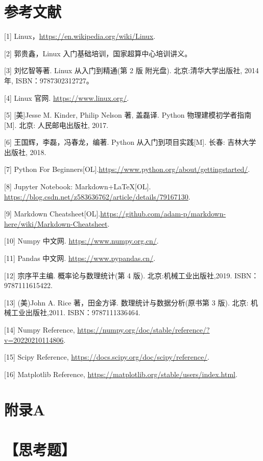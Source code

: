 \documentclass[10pt,a4paper,twoside,UTF8]{ctexart}
\begin{document}
\section*{参考文献}
% 
% 
[1] Linux，\url{https://en.wikipedia.org/wiki/Linux}.

[2] 郭贵鑫，Linux 入门基础培训，国家超算中心培训讲义。

[3] 刘忆智等著. Linux 从入门到精通(第 2 版 附光盘). 北京:清华大学出版社, 2014 年, ISBN：9787302312727。

[4] Linux 官网. \url{https://www.linux.org/}.

[5] [美]Jesse M. Kinder, Philip Nelson 著, 盖磊译. Python 物理建模初学者指南[M]. 北京: 
人民邮电出版社, 2017.

[6] 王国辉，李磊，冯春龙，编著. Python 从入门到项目实践[M]. 长春: 吉林大学出版社, 2018.

[7] Python For Beginners[OL].\url{https://www.python.org/about/gettingstarted/}.

[8] Jupyter Notebook: Markdown+LaTeX[OL]. \url{https://blog.csdn.net/z583636762/article/details/79167130}. 

[9] Markdown Cheatsheet[OL].\url{https://github.com/adam-p/markdown-here/wiki/Markdown-Cheatsheet}. 

[10] Numpy 中文网. \url{https://www.numpy.org.cn/}.

[11] Pandas 中文网. \url{https://www.pypandas.cn/}.

[12] 宗序平主编. 概率论与数理统计(第 4 版). 北京:机械工业出版社,2019. ISBN：9787111615422.

[13] (美)John A. Rice 著，田金方译. 数理统计与数据分析(原书第 3 版). 北京: 机械工业出版社,2011. ISBN：9787111336464.

[14] Numpy Reference, \url{https://numpy.org/doc/stable/reference/?v=20220210114806}.

[15] Scipy Reference, \url{https://docs.scipy.org/doc/scipy/reference/}.

[16] Matplotlib Reference, \url{https://matplotlib.org/stable/users/index.html}.



\clearpage

	
\section*{\LARGE 附录A}
\section*{【思考题】}
\end{document}
